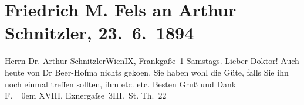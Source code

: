 

         
         \renewcommand{\erwaehntePersonen}{Personen: Richard Beer-Hofmann}
         \renewcommand{\erwaehnteOrte}{Orte: Frankgasse 1, IX., Alsergrund, Krütznergasse, Wien}
         \renewcommand{\erwaehnteWerke}{}
               \section[Friedrich M. Fels an Arthur Schnitzler, 23. 6. 1894]{ Friedrich M. Fels an Arthur Schnitzler, 23. 6. 1894}\nopagebreak{}\rehead{ }\begin{ledgroupsized}[t]{13cm}\normalsize\beginnumbering \toendnotes[C]{\smallbreak\pagebreak[2]} 
\pstart{}{\pb}Herrn Dr. Arthur Schnitzler\pend{}\pstart{}Wien\pend{}\pstart{}IX, Frankgaße 1\pend{}{\bigskip}\pstart
           \raggedleft{}{\pb}Samstags.\pend
           \pstart{}Lieber Doktor!\pend\pstart
           Auch heute von Dr Beer-Hofma{\geminationn} nichts geko{\geminationm}en. Sie haben wohl die Güte, falls Sie
               ihn noch einmal treffen sollten, ihm etc. etc.\pend
           \pstart
           Besten Gruß und Dank{\\[\baselineskip]}\spacefill\mbox{F.}\pend
           \leftskip=0em{}\pstart
           \noindent{}XVIII, Exnergaſse 3III. St. Th. 22\pend
           
         
         \endnumbering{}\end{ledgroupsized}  \newcommand{\dateiname}{L00340}\newcommand{\titel}{Friedrich M. Fels an Arthur Schnitzler, 23. 6. 1894}\newcommand{\editorInnen}{Martin Anton Müller und Gerd-Hermann Susen}
      